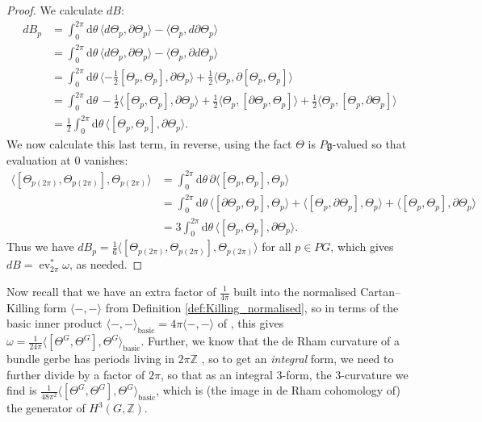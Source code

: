 \documentclass[12pt]{amsart}
\DeclareMathOperator{\ev}{ev}
\theoremstyle{plain}
\theoremstyle{definition}
\theoremstyle{remark}
\numberwithin{equation}{section}
\newcommand{\<}{\langle}
\renewcommand{\>}{\rangle}
\newcommand{\intSone}{\int_{0}^{2\pi}\mathrm{d}\theta\,}
\begin{document}
\begin{proof}
We calculate $d B$:
\begin{align*}
dB_p & = \intSone 
\langle d\Theta_p, \partial \Theta_p\rangle
 -\langle \Theta_p, d\partial\Theta_p \rangle \\
& = \intSone \langle d\Theta_p, \partial \Theta_p\rangle 
- \langle\Theta_p, \partial d\Theta_p\rangle \\
& = \intSone \langle -\frac12[\Theta_p,\Theta_p], \partial \Theta_p\rangle 
+\frac12 \langle\Theta_p, \partial [\Theta_p,\Theta_p]\rangle \\
& = \intSone -\frac12\langle [\Theta_p,\Theta_p], \partial \Theta_p\rangle 
+\frac12 \langle\Theta_p, [\partial \Theta_p,\Theta_p]\rangle 
+ \frac12 \langle\Theta_p, [\Theta_p,\partial\Theta_p]\rangle \\
& = \frac12\intSone \langle [\Theta_p,\Theta_p], \partial \Theta_p\rangle.
\end{align*}
We now calculate this last term, in reverse, using the fact $\Theta$ is $P\mathfrak{g}$-valued so that evaluation at $0$ vanishes:
\begin{align*}
\langle [\Theta_{p(2\pi)},\Theta_{p(2\pi)}],\Theta_{p(2\pi)}\rangle  & = \intSone \partial \langle [\Theta_p,\Theta_p], \Theta_p\rangle \\
& = \intSone\langle [\partial\Theta_p,\Theta_p], \Theta_p\rangle 
+ \langle[\Theta_p,\partial\Theta_p], \Theta_p\rangle 
+ \langle[\Theta_p,\Theta_p], \partial\Theta_p\rangle \\
& = 3\intSone \langle [\Theta_p,\Theta_p], \partial \Theta_p\rangle.
\end{align*}
Thus we have $dB_p = \frac16\langle [\Theta_{p(2\pi)},\Theta_{p(2\pi)}],\Theta_{p(2\pi)}\rangle $ for all $p\in PG$, which gives $dB = \ev_{2\pi}^*\omega$, as needed.
\end{proof}

Now recall that we have an extra factor of $\frac{1}{4\pi}$ built into the normalised Cartan--Killing form $\langle -,-\rangle $ from Definition \ref{def:Killing_normalised}, so in terms of the basic inner product $\langle-,-\rangle_\text{basic} = 4\pi\langle -,-\rangle$ of \cite{PS}, this gives $\omega = \frac{1}{24\pi}\langle[\Theta^G,\Theta^G],\Theta^G\rangle_\text{basic}$.
Further, we know that the de Rham curvature of a bundle gerbe has periods living in $2\pi\mathbb{Z}$ \cite{Mur}, so to get an \emph{integral} form, we need to further divide by a factor of $2\pi$, so that as an integral 3-form, the 3-curvature we find is $\frac{1}{48\pi^2}\langle[\Theta^G,\Theta^G],\Theta^G\rangle_\text{basic}$, which is (the image in de Rham cohomology of) the generator of  $H^3(G,\mathbb{Z})$.
\end{document}
